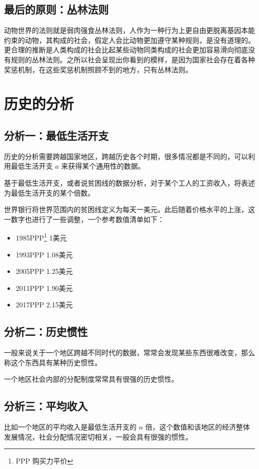 \documentclass[12pt,oneside]{book}
\begin{document}
\section{最后的原则：丛林法则}

动物世界的法则就是弱肉强食丛林法则，人作为一种行为上更自由更脱离基因本能约束的动物，其构成的社会，假定人会比动物更加遵守某种规则，是没有道理的。更合理的推断是人类构成的社会比起某些动物同类构成的社会更加容易滑向彻底没有规则的丛林法则。之所以社会呈现出你看到的模样，是因为国家社会存在着各种奖惩机制，在这些奖惩机制照顾不到的地方，只有丛林法则。


\chapter{历史的分析}
\section{分析一：最低生活开支}
历史的分析需要跨越国家地区，跨越历史各个时期，很多情况都是不同的，可以利用最低生活开支 $ a $ 来获得某个通用性的数据。

基于最低生活开支，或者说贫困线的数据分析，对于某个工人的工资收入，将表述为最低生活开支的某个倍数。

世界银行将世界范围内的贫困线定义为每天一美元。此后随着价格水平的上涨，这一数字也进行了一些调整，一个参考数值清单如下：

\begin{itemize}
\item 1985PPP\footnote{PPP 购买力平价} 1美元
\item 1993PPP 1.08美元
\item 2005PPP 1.25美元
\item 2011PPP 1.90美元
\item 2017PPP 2.15美元
\end{itemize}


\section{分析二：历史惯性}
一般来说关于一个地区跨越不同时代的数据，常常会发现某些东西很难改变，那么称这个东西具有某种历史惯性。

一个地区社会内部的分配制度常常具有很强的历史惯性。


\section{分析三：平均收入}
比如一个地区的平均收入是最低生活开支的 $ n $ 倍，这个数值和该地区的经济整体发展情况，社会分配情况密切相关，一般会具有很强的惯性。
\end{document}
